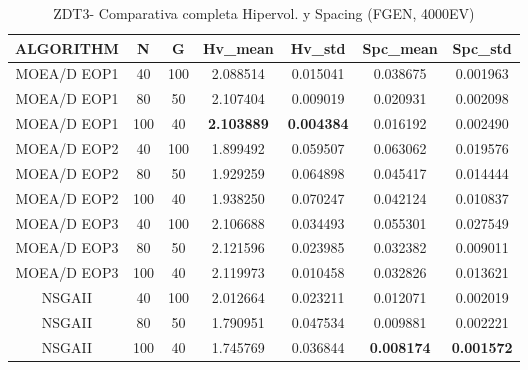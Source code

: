 \begin{table}[H]
\centering
\renewcommand{\arraystretch}{1.5}
\begin{tabular}{ccccccc}
\toprule
ALGORITHM  &    N &    G &   Hv\_mean &    Hv\_std &  Spc\_mean &   Spc\_std \\
\midrule
MOEA/D EOP1 &   40 &  100 &  2.088514 &  0.015041 &  0.038675 &  0.001963 \\
MOEA/D EOP1 &   80 &   50 &  2.107404 &  0.009019 &  0.020931 &  0.002098 \\
MOEA/D EOP1 &  100 &   40 &  \textbf{2.103889} &  \textbf{0.004384} &  0.016192 &  0.002490 \\
MOEA/D EOP2 &   40 &  100 &  1.899492 &  0.059507 &  0.063062 &  0.019576 \\
MOEA/D EOP2 &   80 &   50 &  1.929259 &  0.064898 &  0.045417 &  0.014444 \\
MOEA/D EOP2 &  100 &   40 &  1.938250 &  0.070247 &  0.042124 &  0.010837 \\
MOEA/D EOP3 &   40 &  100 &  2.106688 &  0.034493 &  0.055301 &  0.027549 \\
MOEA/D EOP3 &   80 &   50 &  2.121596 &  0.023985 &  0.032382 &  0.009011 \\
MOEA/D EOP3 &  100 &   40 &  2.119973 &  0.010458 &  0.032826 &  0.013621 \\
NSGAII &   40 &  100 &  2.012664 &  0.023211 &  0.012071 &  0.002019 \\
NSGAII &   80 &   50 &  1.790951 &  0.047534 &  0.009881 &  0.002221 \\
NSGAII &  100 &   40 &  1.745769 &  0.036844 &  \textbf{0.008174} &  \textbf{0.001572} \\
\bottomrule
\end{tabular}
\caption{ZDT3- Comparativa completa Hipervol. y Spacing (FGEN, 4000EV)}
\label{table:1}
\end{table}

